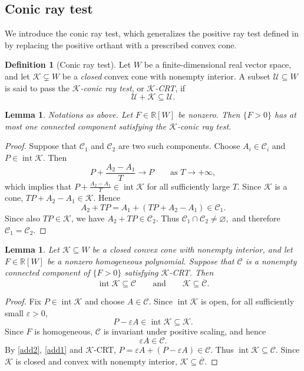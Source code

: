 \documentclass[oneside,english,letterpaper]{amsart}
\numberwithin{equation}{section}
\theoremstyle{plain}
\newtheorem{lem}[thm]{Lemma}
\theoremstyle{definition}
\newtheorem{defn}[thm]{Definition}
\theoremstyle{remark}
\begin{document}
\subsection{Conic ray test}
We introduce the conic ray test, which generalizes the positive ray
test defined in \cite{fang2026idealgaardingpolynomials} by replacing the positive orthant with a prescribed convex cone.
\begin{defn}[Conic ray test]
\label{def:K-CRT}
Let \(W\) be a finite-dimensional real vector space, and let
\(\mathcal K\subsetneq W\) be a \emph{closed} convex cone with nonempty
interior. A subset
\(\mathcal U\subseteq W\) is said to pass the
\emph{\(\mathcal K\)-conic ray test}, or \emph{\(\mathcal K\)-CRT},
if
\[
\mathcal U+\mathcal K\subseteq\mathcal U.
\]
\end{defn}
\begin{lem}
\label{lem:uniqueness-K-component}
Notations as above. Let \(F\in\mathbb{R}[W]\) be nonzero. Then \(\{F>0\}\) has at most
one connected component satisfying the \(\mathcal K\)-conic ray
test.
\end{lem}
\begin{proof}
Suppose that \(\mathcal C_1\) and \(\mathcal C_2\) are two such
components. Choose \(A_i\in\mathcal C_i\) and
\(P\in\operatorname{int}\mathcal K\). Then
\[
P+\frac{A_2-A_1}{T}\longrightarrow P
\qquad\text{as }T\longrightarrow+\infty,
\]
which implies that
\(
P+\frac{A_2-A_1}{T}\in\operatorname{int}\mathcal K
\)
for all sufficiently large \(T\). Since \(\mathcal K\) is a cone,
\(
TP+A_2-A_1\in\mathcal K.
\)
Hence
\[
A_2+TP
=
A_1+(TP+A_2-A_1)
\in\mathcal C_1.
\]
Since also \(TP\in\mathcal K\), we have
\(
A_2+TP\in\mathcal C_2.
\)
Thus
\(
\mathcal C_1\cap\mathcal C_2\neq\varnothing,
\)
and therefore
\(
\mathcal C_1=\mathcal C_2.
\)
\end{proof}
\begin{lem}
\label{lem:K-contained-homogeneous-component}
Let \(\mathcal K\subseteq W\) be a closed convex cone with nonempty
interior, and let \(F\in\mathbb{R}[W]\) be a nonzero homogeneous
polynomial. Suppose that \(\mathcal C\) is a nonempty connected
component of \(\{F>0\}\) satisfying \(\mathcal K\)-CRT. Then
\[
\operatorname{int}\mathcal K\subseteq\mathcal C
\qquad\text{and}\qquad
\mathcal K\subseteq\overline{\mathcal C}.
\]
\end{lem}
\begin{proof}
Fix \(P\in\operatorname{int}\mathcal K\) and choose
\(A\in\mathcal C\). Since \(\operatorname{int}\mathcal K\) is open,
for all sufficiently small \(\varepsilon>0\),
\begin{equation}\label{add2}
P-\varepsilon A\in\operatorname{int}\mathcal K
\subseteq\mathcal K.\end{equation}
Since \(F\) is homogeneous, \(\mathcal C\) is invariant under
positive scaling, and hence
\begin{equation}\label{add1}
\varepsilon A\in\mathcal C.
\end{equation}
By \eqref{add2}, \eqref{add1} and \(\mathcal K\)-CRT,
\(
P
=
\varepsilon A+(P-\varepsilon A)
\in\mathcal C.
\)
Thus
\(
\operatorname{int}\mathcal K\subseteq\mathcal C.
\)
Since \(\mathcal K\) is closed and convex with nonempty interior,
\(
\mathcal K\subseteq\overline{\mathcal C}.
\)
\end{proof}
\end{document}
